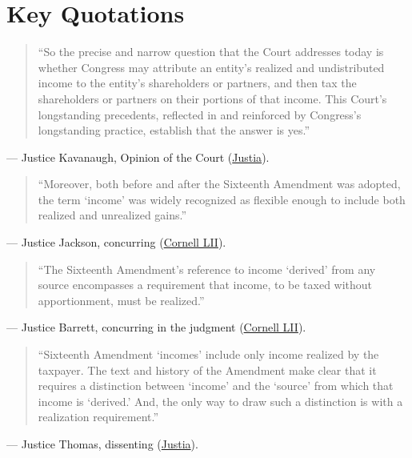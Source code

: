 \documentclass[12pt]{article}
\begin{document}
\section{Key Quotations}
\begin{quote}
``So the precise and narrow question that the Court addresses today is whether Congress may attribute an entity's realized and undistributed income to the entity's shareholders or partners, and then tax the shareholders or partners on their portions of that income. This Court's longstanding precedents, reflected in and reinforced by Congress's longstanding practice, establish that the answer is yes.''
\end{quote}
\noindent --- Justice Kavanaugh, Opinion of the Court (\href{https://supreme.justia.com/cases/federal/us/602/22-800/}{Justia}).

\begin{quote}
``Moreover, both before and after the Sixteenth Amendment was adopted, the term `income' was widely recognized as flexible enough to include both realized and unrealized gains.''
\end{quote}
\noindent --- Justice Jackson, concurring (\href{https://www.law.cornell.edu/supremecourt/text/22-800_2024-06-20}{Cornell LII}).

\begin{quote}
``The Sixteenth Amendment's reference to income `derived' from any source encompasses a requirement that income, to be taxed without apportionment, must be realized.''
\end{quote}
\noindent --- Justice Barrett, concurring in the judgment (\href{https://www.law.cornell.edu/supremecourt/text/22-800_2024-06-20}{Cornell LII}).

\begin{quote}
``Sixteenth Amendment `incomes' include only income realized by the taxpayer. The text and history of the Amendment make clear that it requires a distinction between `income' and the `source' from which that income is `derived.' And, the only way to draw such a distinction is with a realization requirement.''
\end{quote}
\noindent --- Justice Thomas, dissenting (\href{https://supreme.justia.com/cases/federal/us/602/22-800/}{Justia}).
\end{document}
